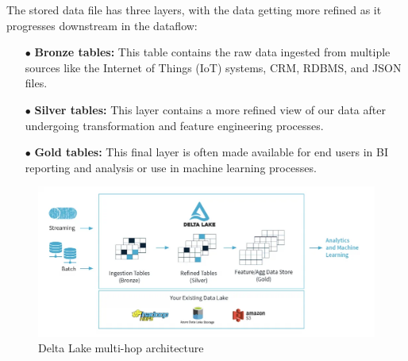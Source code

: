 The stored data file has three layers, with the data getting more refined as it progresses downstream in the dataflow:

\begin{enumerate}
\item[$\bullet$] \textbf{Bronze tables:} This table contains the raw data ingested from multiple sources like the Internet of Things (IoT) systems, CRM, RDBMS, and JSON files.
\item[$\bullet$] \textbf{Silver tables:} This layer contains a more refined view of our data after undergoing transformation and feature engineering processes.
\item[$\bullet$] \textbf{Gold tables:} This final layer is often made available for end users in BI reporting and analysis or use in machine learning processes.
\end{enumerate}

\begin{figure}[htbp]
\centering
\includegraphics[width=\linewidth]{images/delta_lake_architecture.png}
\caption{Delta Lake multi-hop architecture}\label{fig:delta-lake-architecture}
\end{figure}

